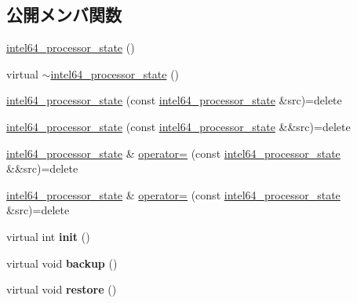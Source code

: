 \subsection*{公開メンバ関数}
\begin{DoxyCompactItemize}
\item 
\hyperlink{classintel64__processor__state_ab3a8e501f61ac644097d0fb270a48848}{intel64\+\_\+processor\+\_\+state} ()
\item 
virtual \hyperlink{classintel64__processor__state_a080fbfaabb6819531c70ed92f4c0fff8}{$\sim$intel64\+\_\+processor\+\_\+state} ()
\item 
\hyperlink{classintel64__processor__state_a3738e66d78d9a28faf9ac8add8f350ac}{intel64\+\_\+processor\+\_\+state} (const \hyperlink{classintel64__processor__state}{intel64\+\_\+processor\+\_\+state} \&src)=delete
\item 
\hyperlink{classintel64__processor__state_a963f64f0971ddae9de69ab273afef1d0}{intel64\+\_\+processor\+\_\+state} (const \hyperlink{classintel64__processor__state}{intel64\+\_\+processor\+\_\+state} \&\&src)=delete
\item 
\hyperlink{classintel64__processor__state}{intel64\+\_\+processor\+\_\+state} \& \hyperlink{classintel64__processor__state_af4fe969204b5cebdce8674981ad8f993}{operator=} (const \hyperlink{classintel64__processor__state}{intel64\+\_\+processor\+\_\+state} \&\&src)=delete
\item 
\hyperlink{classintel64__processor__state}{intel64\+\_\+processor\+\_\+state} \& \hyperlink{classintel64__processor__state_a32211085672078b47050e8376715676b}{operator=} (const \hyperlink{classintel64__processor__state}{intel64\+\_\+processor\+\_\+state} \&src)=delete
\item 
\hypertarget{classintel64__processor__state_a860b0103e12ebd4b92ec57797d9aed8b}{}\label{classintel64__processor__state_a860b0103e12ebd4b92ec57797d9aed8b} 
virtual int {\bfseries init} ()
\item 
\hypertarget{classintel64__processor__state_a7a36494e44f9d20cc414b182b0175522}{}\label{classintel64__processor__state_a7a36494e44f9d20cc414b182b0175522} 
virtual void {\bfseries backup} ()
\item 
\hypertarget{classintel64__processor__state_a2d37a8ab375394e307ace448e0227de3}{}\label{classintel64__processor__state_a2d37a8ab375394e307ace448e0227de3} 
virtual void {\bfseries restore} ()
\item 
\hypertarget{classintel64__processor__state_a90cb70a141b5f589991fdf6af0c3530e}{}\label{classintel64__processor__state_a90cb70a141b5f589991fdf6af0c3530e} 

\end{DoxyCompactItemize}
